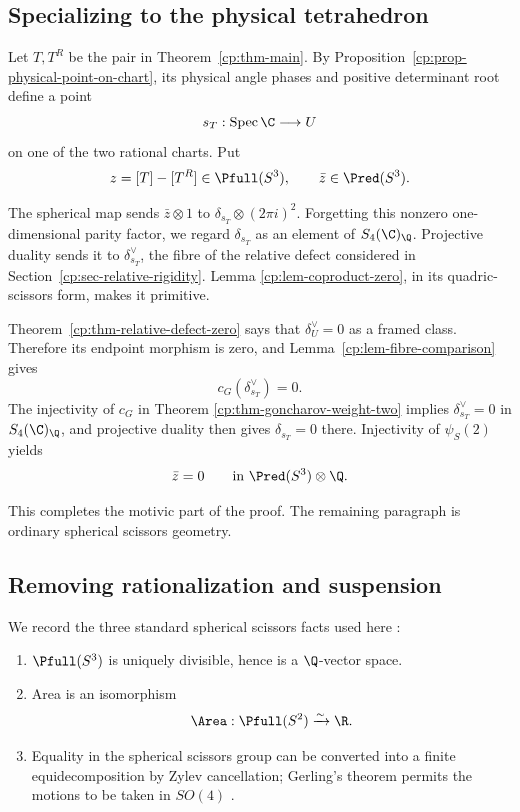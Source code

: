 \subsection{Specializing to the physical tetrahedron}

Let \(T,T^R\) be the pair in Theorem~\ref{cp:thm-main}.  By
Proposition~\ref{cp:prop-physical-point-on-chart}, its physical angle phases
and positive determinant root define a point
\[
 s_T:\Spec\C\longrightarrow U
\]
on one of the two rational charts.  Put
\[
 z=[T]-[T^R]\in\Pfull(S^3),
 \qquad \bar z\in\Pred(S^3).
\]

The spherical map sends
\(\bar z\otimes1\) to
\(\delta_{s_T}\otimes(2\pi i)^2\).  Forgetting this nonzero
one-dimensional parity factor, we regard \(\delta_{s_T}\) as an element of
\(S_4(\C)_\Q\).  Projective duality sends it to
\(\delta_{s_T}^\vee\), the fibre of the relative defect considered in
Section~\ref{cp:sec-relative-rigidity}.  Lemma
\ref{cp:lem-coproduct-zero}, in its quadric-scissors form, makes it
primitive.

Theorem~\ref{cp:thm-relative-defect-zero} says that
\(\delta_U^\vee=0\) as a framed class.  Therefore its endpoint morphism is
zero, and Lemma~\ref{cp:lem-fibre-comparison} gives
\[
 c_G(\delta_{s_T}^\vee)=0.
\]
The injectivity of \(c_G\) in Theorem
\ref{cp:thm-goncharov-weight-two} implies
\(\delta_{s_T}^\vee=0\) in \(S_4(\C)_\Q\), and projective duality then gives
\(\delta_{s_T}=0\) there.  Injectivity of \(\psi_S(2)\) yields
\begin{equation}
 \bar z=0\qquad\text{in }\Pred(S^3)\otimes\Q.
 \label{cp:eq-reduced-regge-zero-rational}
\end{equation}

This completes the motivic part of the proof.  The remaining paragraph is
ordinary spherical scissors geometry.

\subsection{Removing rationalization and suspension}

We record the three standard spherical scissors facts used here
\cite[Example~7.8 and Corollary~9.19(b)]{Dupont2001}:
\begin{enumerate}[label=\textup{(S\arabic*)},leftmargin=2.7em]
\item \(\Pfull(S^3)\) is uniquely divisible, hence is a \(\Q\)-vector
space.
\item Area is an isomorphism
\[
 \Area:\Pfull(S^2)\xrightarrow{\sim}\R.
\]
\item Equality in the spherical scissors group can be converted into a
finite equidecomposition by Zylev cancellation; Gerling's theorem permits
the motions to be taken in \(SO(4)\)
\cite[after Definition~1.6 and Theorem~2.2]{Dupont2001}.
\end{enumerate}

